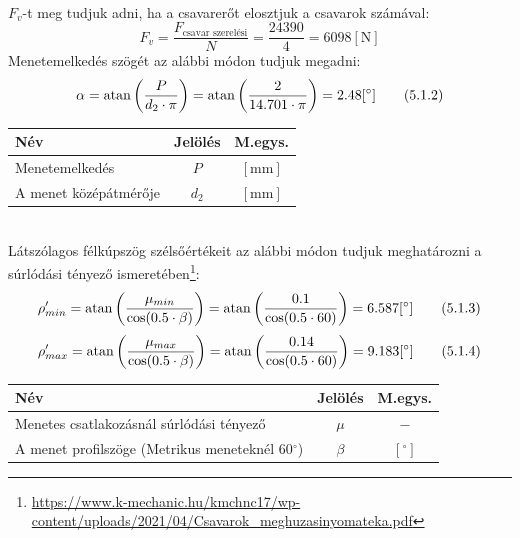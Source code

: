 \documentclass[10pt, a4paper]{article}
\newcommand{\n}{\mathrm{\left[N\right]}}
\newcommand{\mm}{\mathrm{\left[mm\right]}}
\newcommand{\szog}{\mathrm{\left[^{\circ}\right]}}
\begin{document}
	\renewcommand{\arraystretch}{1}\\
	$F_v$-t meg tudjuk adni, ha a csavarerőt elosztjuk a csavarok számával:
	\begin{equation}
		F_v = \dfrac{F_\text{csavar szerelési}}{N} = \dfrac{24390}{4} = 6098 \n\tag{5.1.1} \label{Fv}
	\end{equation}
	Menetemelkedés szögét az alábbi módon tudjuk megadni:
	\begin{equation}
		\alpha = \atan\left(\dfrac{P}{d_2 \cdot \pi}\right) = \atan\left(\dfrac{2}{14.701 \cdot \pi}\right) = 2.48 \szog\tag{5.1.2}
	\end{equation}
	\vspace{-23pt}
		\renewcommand{\arraystretch}{1.4}
							\begin{table}[!h]
								\centering
								\begin{tabular}{l|c|c}
									\textbf{Név}                              & \textbf{Jelölés} & \textbf{M.egys.} \\ \hline
									Menetemelkedés                     & $P$                & $\mm$  \\
									A menet középátmérője                     & $d_2$                & $\mm$        	       
								\end{tabular}
							\end{table}
		\renewcommand{\arraystretch}{1}\\
	Látszólagos félkúpszög szélsőértékeit az alábbi módon tudjuk meghatározni a súrlódási tényező ismeretében\footnote{\url{https://www.k-mechanic.hu/kmchnc17/wp-content/uploads/2021/04/Csavarok_meghuzasinyomateka.pdf}}:
	\begin{equation}
		\rho'_{min} = \atan\left(\dfrac{\mu_{min}}{\cos(0.5 \cdot \beta)}\right) = \atan\left(\dfrac{0.1}{\cos(0.5 \cdot 60)}\right) = 6.587 \szog\tag{5.1.3}
	\end{equation}
	\begin{equation}
			\rho'_{max} = \atan\left(\dfrac{\mu_{max}}{\cos(0.5 \cdot \beta)}\right) = \atan\left(\dfrac{0.14}{\cos(0.5 \cdot 60)}\right) = 9.183 \szog\tag{5.1.4}
	\end{equation}
		\vspace{-20pt}
			\renewcommand{\arraystretch}{1.4}
								\begin{table}[!h]
									\centering
									\begin{tabular}{l|c|c}
										\textbf{Név}                              & \textbf{Jelölés} & \textbf{M.egys.} \\ \hline
										Menetes csatlakozásnál súrlódási tényező                     & $\mu$                & $-$        \\
										A menet profilszöge (Metrikus meneteknél 60$^\circ$)                      & $\beta$                & $\szog$       	       
									\end{tabular}
								\end{table}
\end{document}
